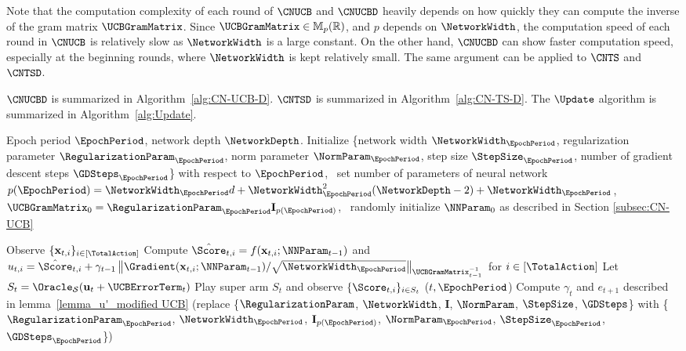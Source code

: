 \documentclass{article}
\theoremstyle{plain}
\begin{document}
Note that the computation complexity of each round of $\CNUCB$ and $\CNUCBD$ heavily depends on how quickly they can compute the inverse of the gram matrix $\UCBGramMatrix$.
Since $\UCBGramMatrix \in \mathbb{M}_p(\mathbb{R})$, and $p$ depends on $\NetworkWidth$, the computation speed of each round in $\CNUCB$ is relatively slow as $\NetworkWidth$ is a large constant.  On the other hand, $\CNUCBD$ can show faster computation speed, especially at the beginning rounds, where $\NetworkWidth$ is kept relatively small.
The same argument can be applied to $\CNTS$ and $\CNTSD$.

$\CNUCBD$ is summarized in Algorithm~\ref{alg:CN-UCB-D}.
$\CNTSD$ is summarized in Algorithm~\ref{alg:CN-TS-D}.
The $\Update$ algorithm is summarized in Algorithm~\ref{alg:Update}.

\begin{algorithm*}[ht]
   \caption{$\CNUCBD$}
   \label{alg:CN-UCB-D}
\begin{algorithmic}
     Epoch period $\EpochPeriod$, network depth $\NetworkDepth$.
     Initialize \{network width $\NetworkWidth_\EpochPeriod$,
        regularization parameter $\RegularizationParam_\EpochPeriod$,
        norm parameter $\NormParam_\EpochPeriod$,
        step size $\StepSize_\EpochPeriod$,
        number of gradient descent steps $\GDSteps_\EpochPeriod$\} with respect to $\EpochPeriod$, \,
        set number of parameters of neural network $p(\EpochPeriod) = \NetworkWidth_\EpochPeriod d + \NetworkWidth_\EpochPeriod^2 (\NetworkDepth-2) + \NetworkWidth_\EpochPeriod$, \,
        $\UCBGramMatrix_{0} = \RegularizationParam_{\EpochPeriod} \mathbf{I}_{p(\EpochPeriod)}$, \,
        randomly initialize $\NNParam_{0}$ as described in Section \ref{subsec:CN-UCB}
    
    \STATE Observe $\{ \mathbf{x}_{t,i} \}_{i \in [\TotalAction]}$
    \STATE Compute $\hat{\Score}_{t,i} = f(\mathbf{x}_{t,i}; \NNParam_{t-1})$ and 
    $u_{t,i} = \hat{\Score}_{t,i} + \gamma_{t-1} \left\| \Gradient(\mathbf{x}_{t,i}; \NNParam_{t-1}) / \sqrt{\NetworkWidth_\EpochPeriod} \right\|_{\UCBGramMatrix_{t-1}^{-1}}$ for $i \in [\TotalAction]$
    \STATE Let $S_t = \Oracle_{\mathcal{S}} (\mathbf{u}_t + \mathbf{\UCBErrorTerm}_t)$ 
    \STATE Play super arm $S_t$ and observe $\{ \Score_{t, i} \}_{i \in S_t}$
    \STATE \Update($t, \EpochPeriod$)
    \STATE Compute $\gamma_t$ and $e_{t+1}$ described in lemma~\ref{lemma_u'_modified UCB} (replace
    \{$\RegularizationParam$,
    $\NetworkWidth$,
    $\mathbf{I}$,
    $\NormParam$,
    $\StepSize$,
    $\GDSteps$\} with
    \{$\RegularizationParam_\EpochPeriod$,
    $\NetworkWidth_\EpochPeriod$,
    $\mathbf{I}_{p(\EpochPeriod)}$,
    $\NormParam_\EpochPeriod$,
    $\StepSize_\EpochPeriod$,
    $\GDSteps_\EpochPeriod$\})
    \ENDWHILE
\end{algorithmic}
\end{algorithm*}
\end{document}
